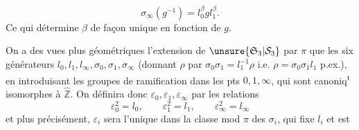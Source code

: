 \[
\sigma_\infty(g^{-1})=l_0^\beta g l_1^\beta.
\]
Ce qui détermine $\beta$ de façon unique en fonction de $g$.


On a des vues plus géométriques   l'extension de $\unsure{\mathfrak S_3|\mathcal S_3}$ par $\pi$  que les six générateurs $l_0,l_1,l_\infty,\sigma_0,\sigma_1,\sigma_\infty$ (donnant $\rho$ par $\sigma_0\sigma_1=l_1^{-1}\rho$  i.e. $\rho=\sigma_0\sigma_1l_1$ p.ex.), en introduisant les groupes de ramification dans les pts $0,1,\infty$, qui sont canoniq\textsuperscript{t} isomorphes à $\widehat{\mathbb Z}$.
On définira donc $\varepsilon_0,\varepsilon_1,\varepsilon_\infty$ par les relations
\[
\varepsilon_0^2=l_0,\qquad\varepsilon_1^2=l_1,\qquad\varepsilon_\infty^2=l_\infty
\]
et plus précisément, $\varepsilon_i$ sera l'unique   dans la classe mod $\pi$ des $\sigma_i$,  qui fixe $l_i$ et est  
